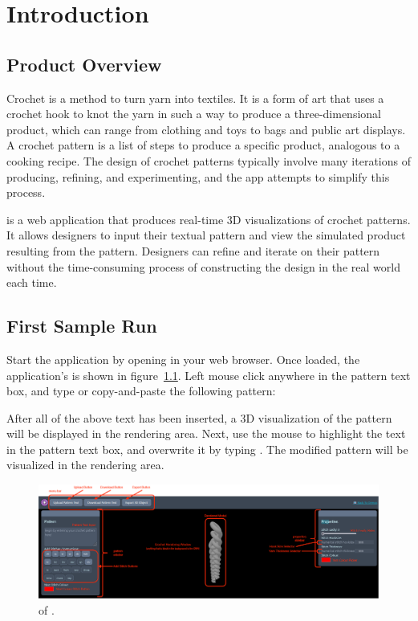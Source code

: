 \documentclass[main.tex]{subfiles}
\begin{document}
\chapter{Introduction}\label{chp:introduction}

\section{Product Overview}

Crochet is a method to turn yarn into textiles. It is a form of art that uses a crochet hook to knot the yarn in such a way to produce a three-dimensional product, which can range from clothing and toys to bags and public art displays. A crochet pattern is a list of steps to produce a specific product, analogous to a cooking recipe. The design of crochet patterns typically involve many iterations of producing, refining, and experimenting, and the \CC{} app attempts to simplify this process.

\CC{} is a web application that produces real-time 3D visualizations of crochet patterns. It allows designers to input their textual pattern and view the simulated product resulting from the pattern. Designers can refine and iterate on their pattern without the time-consuming process of constructing the design in the real world each time.

\section{First Sample Run}

Start the \CC{} application by opening \href{https://crochetcraft.jtai.ca}{} in your web browser. Once loaded, the application's \ScLayout{} is shown in figure~\ref{fig:layout}. Left mouse click anywhere in the pattern text box, and type or copy-and-paste the following pattern:


After all of the above text has been inserted, a 3D visualization of the pattern will be displayed in the rendering area. Next, use the mouse to highlight the text  in the pattern text box, and overwrite it by typing . The modified pattern will be visualized in the rendering area.

\begin{figure}[htbp]
    \centering
    \includegraphics[width=\linewidth]{layout.png}
    \caption{\ScLayout{} of \CC.}
    \label{fig:layout}
\end{figure}
\end{document}
